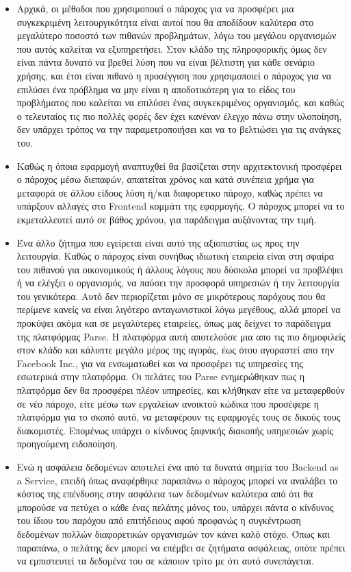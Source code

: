 \documentclass{article}
\begin{document}
\begin{itemize}
\item Αρχικά, οι μέθοδοι που χρησιμοποιεί ο πάροχος για να προσφέρει μια συγκεκριμένη λειτουργικότητα είναι αυτοί που θα αποδίδουν καλύτερα στο μεγαλύτερο ποσοστό των πιθανών προβλημάτων, λόγω του μεγάλου οργανισμών που αυτός καλείται να εξυπηρετήσει. Στον κλάδο της πληροφορικής όμως δεν είναι πάντα δυνατό να βρεθεί λύση που να είναι βέλτιστη για κάθε σενάριο χρήσης, και έτσι είναι πιθανό η προσέγγιση που χρησιμοποιεί ο πάροχος για να επιλύσει ένα πρόβλημα να μην είναι η αποδοτικότερη για το είδος του προβλήματος που καλείται να επιλύσει ένας συγκεκριμένος οργανισμός, και καθώς ο τελευταίος τις πιο πολλές φορές δεν έχει κανέναν έλεγχο πάνω στην υλοποίηση, δεν υπάρχει τρόπος να την παραμετροποιήσει  και να το βελτιώσει για τις ανάγκες του.
\item Καθώς η όποια εφαρμογή αναπτυχθεί θα βασίζεται στην αρχιτεκτονική προσφέρει ο πάροχος μέσω διεπαφών, απαιτείται χρόνος και κατά συνέπεια χρήμα για μεταφορά σε άλλου είδους λύση ή/και διαφορετικο πάροχο, καθώς πρέπει να υπάρξουν αλλαγές στο Frontend κομμάτι της εφαρμογής. Ο πάροχος μπορεί να το εκμεταλλευτεί αυτό σε βάθος χρόνου, για παράδειγμα αυξάνοντας την τιμή.
\item Ένα άλλο ζήτημα που εγείρεται είναι αυτό της αξιοπιστίας ως προς την λειτουργία. Καθώς ο πάροχος είναι συνήθως ιδιωτική εταιρεία είναι στη σφαίρα του πιθανού για οικονομικούς ή άλλους λόγους που δύσκολα μπορεί να προβλέψει ή να ελέγξει ο οργανισμός, να παύσει την προσφορά υπηρεσιών ή την λειτουργία του γενικότερα. Αυτό δεν περιορίζεται μόνο σε μικρότερους παρόχους που θα περίμενε κανείς να είναι λιγότερο ανταγωνιστικοί λόγω μεγέθους, αλλά μπορεί να προκύψει ακόμα και σε μεγαλύτερες εταιρείες, όπως μας δείχνει το παράδειγμα της πλατφόρμας Parse. Η πλατφόρμα αυτή αποτελούσε μια απο τις πιο δημοφιλείς στον κλάδο και κάλυπτε μεγάλο μέρος της αγοράς, έως ότου αγοραστεί απο την Facebook Inc., για να ενσωματωθεί και να προσφέρει τις υπηρεσίες της εσωτερικά στην πλατφόρμα. Οι πελάτες του Parse ενημερώθηκαν πως η πλατφόρμα δεν θα προσφέρει πλέον υπηρεσίες, και κλήθηκαν είτε να μεταφερθούν σε νέο πάροχο, είτε μέσω των εργαλείων ανοικτού κώδικα που προσέφερε η πλατφόρμα για το σκοπό αυτό, να μεταφέρουν τις εφαρμογές τους σε δικούς τους διακομιστές. Επομένως υπάρχει ο κίνδυνος ξαφνικής διακοπής υπηρεσιών χωρίς προηγούμενη ειδοποίηση.
\item Ενώ η ασφάλεια δεδομένων αποτελεί ένα από τα δυνατά σημεία του Backend as a Service, επειδή όπως αναφέρθηκε παραπάνω ο πάροχος μπορεί να αναλάβει το κόστος της επένδυσης στην ασφάλεια των δεδομένων καλύτερα από ότι θα μπορούσε να πετύχει ο κάθε ένας πελάτης μόνος του, υπάρχει πάντα ο κίνδυνος του ίδιου του παρόχου από επιτήδειους αφού προφανώς η συγκέντρωση δεδομένων πολλών διαφορετικών οργανισμών τον κάνει καλό στόχο. Όπως και παραπάνω, ο πελάτης δεν μπορεί να επέμβει σε ζητήματα ασφάλειας, οπότε πρέπει να εμπιστευτεί τα δεδομένα του σε κάποιον τρίτο με ότι αυτό συνεπάγεται.

\end{itemize}
\end{document}
